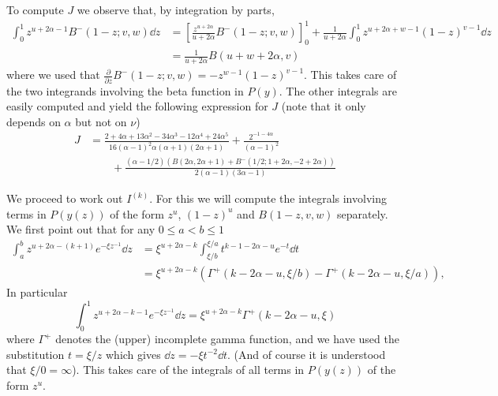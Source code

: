 To compute $J$ we observe that, by integration by parts, 
\begin{align*}
	\int_0^1 z^{u+2\alpha-1} B^-(1-z;v,w) \dd z 
	&= \left[ \frac{z^{u+2\alpha}}{u+2\alpha} B^-(1-z;v,w) \right]_0^1 
		+ \frac{1}{u+2\alpha} \int_0^1 z^{u+2\alpha+w-1} (1-z)^{v-1} \dd z \\
	&= \frac{1}{u+2\alpha} B(u+w+2\alpha,v)
\end{align*}
where we used that $\frac{\partial}{\partial z} B^-(1-z;v,w) = - z^{w-1} (1-z)^{v-1}$. This takes care of the two integrands involving the beta function in $P(y)$. The other integrals are easily computed and yield the following expression for $J$ (note that it only depends on $\alpha$ but not on $\nu$)
\begin{align*}
J&=\frac{2 + 4 \alpha + 13 \alpha^2 - 34 \alpha^3 - 12\alpha^4 + 
	24 \alpha^5}{16(\alpha-1)^2 \alpha (\alpha+1) (2\alpha+1)} +  \frac{2^{-1 - 
		4 \alpha}}{(\alpha - 1)^2} \\
	&\qquad+ \frac{(\alpha - 1/2) (B(2 \alpha, 2 \alpha + 1) + 
	B^-(1/2; 1 + 2 \alpha, -2 + 2 \alpha))}{2 (\alpha - 1) (3 \alpha - 1)}
\end{align*}

We proceed to work out $I^{(k)}$. For this we will compute the integrals involving terms in $P(y(z))$ of the form $z^u$, $(1-z)^u$ and $B(1-z,v,w)$ separately. We first point out that for any $0 \le a < b \le 1$
\begin{align*}
	\int_a^b z^{u+2\alpha-(k+1)} e^{-\xi z^{-1}} \dd z
	&= \xi^{u+2\alpha-k} \int_{\xi/b}^{\xi/a} t^{k-1-2\alpha-u} e^{-t} \dd t \\
	&= \xi^{u+2\alpha-k} \left( \Gamma^+( k-2\alpha-u,\xi/b) - \Gamma^+( k-2\alpha-u, \xi/a) \right), 
\end{align*}
In particular
\begin{equation}\label{eq:integral_Delta_P_z}
	\int_0^1 z^{u+2\alpha-k-1} e^{-\xi z^{-1}} \dd z = \xi^{u+2\alpha-k} \Gamma^+(k-2\alpha-u,\xi)
\end{equation}
where $\Gamma^+$ denotes the (upper) incomplete gamma function, and we have used the substitution
$t = \xi / z$ which gives $\dd z = -\xi t^{-2} \dd t$. (And of course it is understood that 
$\xi/0 = \infty$). This takes care of the integrals of all terms in $P(y(z))$ of the form $z^{u}$. 


